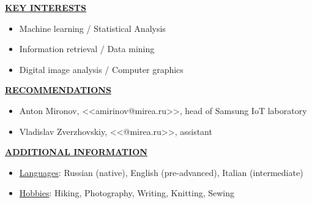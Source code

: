 \documentclass[a4paper,10pt,fullpage]{article}
\begin{document}
\begin{center}
	\underline{\textbf{KEY INTERESTS}}
\end{center}
\begin{itemize}
	\item Machine learning / Statistical Analysis
	\item Information retrieval / Data mining
	\item Digital image analysis / Computer graphics\\
\end{itemize}

\begin{center}
	\underline{\textbf{RECOMMENDATIONS}}
\end{center}
\begin{itemize}
	\item Anton Mironov, <<amirinov@mirea.ru>>, head of Samsung IoT laboratory
	\item Vladislav Zverzhovskiy, <<@mirea.ru>>, assistant\\
\end{itemize}

\begin{center}
	\underline{\textbf{ADDITIONAL INFORMATION}}
\end{center}
\begin{itemize}
	\item \underline{Languages}: Russian (native), English (pre-advanced), Italian (intermediate)
	\item \underline{Hobbies}: Hiking, Photography, Writing, Knitting, Sewing
\end{itemize}


\end{document}
